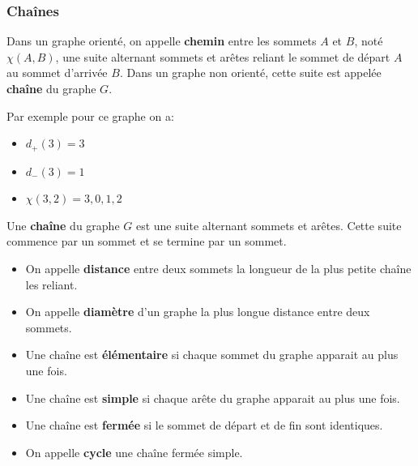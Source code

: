 \begin{frame}[fragile]
\frametitle{Chaînes}
Dans un graphe orienté, on appelle \textbf{chemin} entre les sommets $A$ et $B$, noté $\chi(A,B)$, une suite alternant sommets et arêtes reliant le sommet de départ $A$ au sommet d'arrivée $B$. Dans un graphe non orienté, cette suite est appelée \textbf{chaîne} du graphe $G$.

\begin{minipage}[l]{0.3\linewidth}
\begin{center}
\end{center}
\end{minipage}
\begin{minipage}[l]{0.65\linewidth}
Par exemple pour ce graphe on a: 
\begin{itemize}
 \item $d_+(3) = 3$
 \item $d_-(3) = 1 $
 \item $\chi(3,2)= {3,0,1,2}$
\end{itemize}
\end{minipage}

Une \textbf{chaîne} du graphe $G$ est une suite alternant sommets et arêtes. Cette suite commence par un sommet et se termine par un sommet.

\begin{itemize}
\item On appelle \textbf{distance} entre deux sommets la longueur de la plus petite chaîne les reliant.
\item On appelle \textbf{diamètre} d'un graphe la plus longue distance entre deux sommets.
\item Une chaîne est \textbf{élémentaire} si chaque sommet du graphe apparait au plus une fois.
\item Une chaîne est \textbf{simple} si chaque arête du graphe apparait au plus une fois.
\item Une chaîne est \textbf{fermée} si le sommet de départ et de fin sont identiques.
\item On appelle \textbf{cycle} une chaîne fermée simple.
\end{itemize}
\end{frame}


